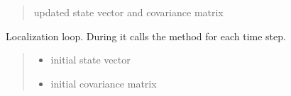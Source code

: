 \documentclass[letterpaper,10pt,english]{sphinxmanual}
\begin{document}
\begin{fulllineitems}
\begin{fulllineitems}
\begin{quote}
\begin{description}
\begin{itemize}
\end{itemize}

\sphinxAtStartPar
updated state vector and covariance matrix

\end{description}\end{quote}

\end{fulllineitems}


\begin{fulllineitems}
\label{\detokenize{GFLocalization:GFLocalization.GFLocalization.LocalizationLoop}}
\pysigstartsignatures
{}
\pysigstopsignatures
\sphinxAtStartPar
Localization loop. During  it calls the {\hyperref[\detokenize{GFLocalization:GFLocalization.GFLocalization.Localize}]{}} method for each time step.
\begin{quote}\begin{description}
\begin{itemize}
\item {} 
\sphinxAtStartPar
{} \textendash{} initial state vector

\item {} 
\sphinxAtStartPar
{} \textendash{} initial covariance matrix

\end{itemize}

\end{description}\end{quote}

\end{fulllineitems}



\end{fulllineitems}
\end{document}
